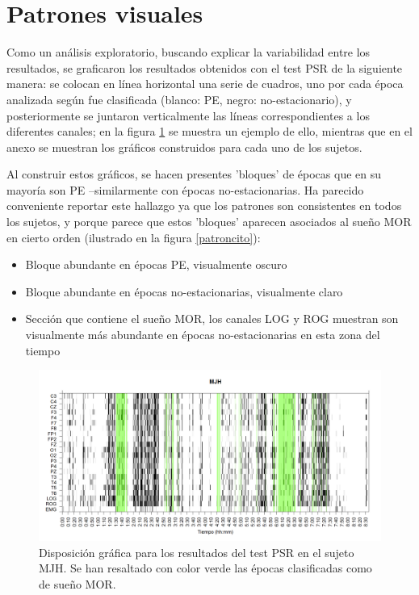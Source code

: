 \documentclass[12pt,a4paper]{mitthesis}
\begin{document}

\section{Patrones visuales}

Como un an\'alisis exploratorio, buscando explicar la variabilidad entre los resultados, se 
graficaron los resultados obtenidos con el test PSR de la siguiente manera: se colocan en 
l\'inea horizontal una serie de cuadros, uno por cada \'epoca analizada seg\'un fue clasificada 
(blanco: PE, negro: no-estacionario), y posteriormente se juntaron verticalmente las l\'ineas
correspondientes a los diferentes canales; en la figura \ref{ejemplo_graf} se muestra un ejemplo de
ello, mientras que en el anexo se muestran los gr\'aficos construidos para cada uno de los sujetos. 

Al construir estos gr\'aficos, se hacen presentes 'bloques' de \'epocas que en su mayor\'ia son
PE --similarmente con \'epocas no-estacionarias. Ha parecido conveniente reportar este hallazgo
ya que los patrones son consistentes en todos los sujetos, y porque parece que estos 'bloques'
aparecen asociados al sue\~no MOR en cierto orden (ilustrado en la figura \ref{patroncito}):
\begin{itemize}
\item Bloque abundante en \'epocas PE, visualmente oscuro
\item Bloque abundante en \'epocas no-estacionarias, visualmente claro
\item Secci\'on que contiene el sue\~no MOR, los canales LOG y ROG muestran son visualmente m\'as
abundante en \'epocas no-estacionarias en esta zona del tiempo
\end{itemize}


\begin{figure}
\includegraphics[width=\textwidth]
{./g170413/MJNNVIGILOS_est.png}
\caption{Disposici\'on gr\'afica para los resultados del test PSR en el sujeto MJH. Se han 
resaltado con color verde las \'epocas clasificadas como de sue\~no MOR.
}
\label{ejemplo_graf}
\end{figure}
\end{document}
